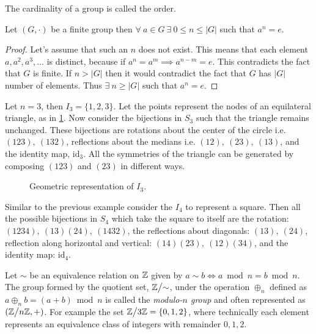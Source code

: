 \begin{definition}
  The cardinality of a group is called the order. 
\end{definition}
\begin{proposition}
  Let $(G,\cdot)$ be a finite group then $\forall\ a\in G\ \exists\ 0 \leq n\leq |G|$ such that $a^n = e$.
\end{proposition}
\begin{proof}
  Let's assume that such an $n$ does not exist. This means that each element $a, a^2, a^3,...$ is distinct, because if $a^n = a^m \implies a^{n-m} = e$. This contradicts the fact that $G$ is finite. If $n>|G|$ then it would contradict the fact that $G$ has $|G|$ number of elements. Thus $\exists\ n \geq |G|$ such that $a^n = e$.
\end{proof}
\begin{example}
  Let $n=3$, then $I_3 = \{1,2,3\}$. Let the points represent the nodes of an equilateral triangle, as in \cref{fig:triangle}. Now consider the bijections in $S_3$ such that the triangle remains unchanged. These bijections are rotations about the center of the circle i.e. $(123),\ (132)$, reflections about the medians i.e. $(12),\ (23),\ (13)$, and the identity map, $\text{id}_3$. All the symmetries of the triangle can be generated by composing $(123)$ and $(23)$ in different ways.
\end{example}
\begin{figure}[ht]
    \centering
    \caption{Geometric representation of $I_3$.}
    \label{fig:triangle}
\end{figure}
\begin{example}
  Similar to the previous example consider the $I_4$ to represent a square. Then all the possible bijections in $S_4$ which take the square to itself are the rotation: $(1234),\ (13)(24),\ (1432)$, the reflections about diagonals: $(13),\ (24)$, reflection along horizontal and vertical: $(14)(23),\ (12)(34)$, and the identity map: $\text{id}_4$. 
\end{example}
\begin{example}
  Let $\sim$ be an equivalence relation on $\mathbb{Z}$ given by $a \sim b \iff a\bmod n = b\bmod n$. The group formed by the quotient set, $\Z\bign/\sim$, under the operation $\oplus_n$ defined as $a\oplus_n b = (a+b)\bmod n$ is called the \textit{modulo-$n$ group} and often represented as $(\Z\bign/n\Z, +)$. For example the set $\Z\bign/3\Z = \{0,1,2\}$, where technically each element represents an equivalence class of integers with remainder $0,1,2$. 
\end{example}
